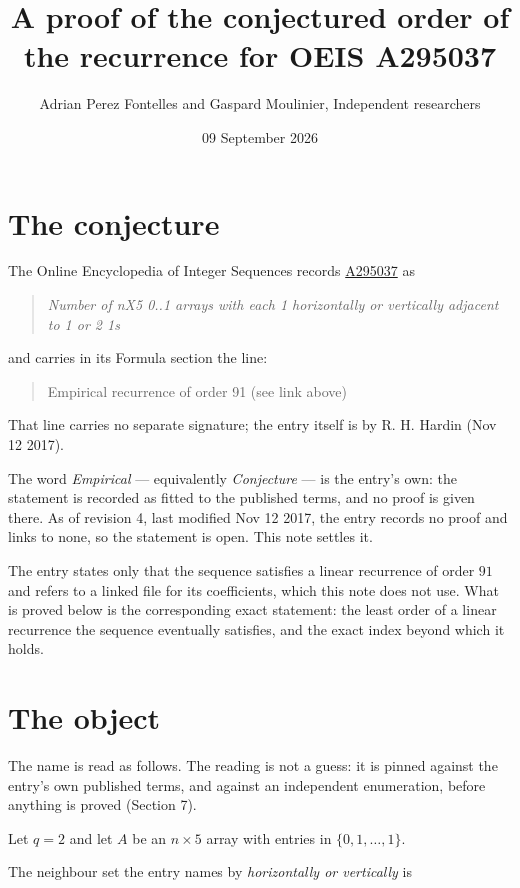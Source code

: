 \documentclass[11pt]{article}
\title{A proof of the conjectured order of the recurrence for OEIS A295037}
\author{Adrian Perez Fontelles and Gaspard Moulinier, Independent researchers}
\date{09 September 2026}
\theoremstyle{definition}
\begin{document}
\maketitle
\section{The conjecture}

The Online Encyclopedia of Integer Sequences records \href{https://oeis.org/A295037}{A295037} as

\begin{quote}\itshape Number of nX5 0..1 arrays with each 1 horizontally or vertically adjacent to 1 or 2 1s\end{quote}

and carries in its Formula section the line:

\begin{quote}\ttfamily Empirical recurrence of order 91 (see link above)\end{quote}

That line carries no separate signature; the entry itself is by R. H. Hardin (Nov 12 2017).

The word {\itshape Empirical} --- equivalently {\itshape Conjecture} --- is the entry's own: the statement is recorded as fitted to the published terms, and no proof is given there. As of revision 4, last modified Nov 12 2017, the entry records no proof and links to none, so the statement is open. This note settles it.

The entry states only that the sequence satisfies a linear recurrence of order $91$ and refers to a linked file for its coefficients, which this note does not use. What is proved below is the corresponding exact statement: the least order of a linear recurrence the sequence eventually satisfies, and the exact index beyond which it holds.

\section{The object}

The name is read as follows. The reading is not a guess: it is pinned against the entry's own published terms, and against an independent enumeration, before anything is proved (Section 7).

Let $q = 2$ and let $A$ be an $n \times 5$ array with entries in $\{0,1,\dots,1\}$.

The neighbour set the entry names by {\itshape horizontally or vertically} is
\end{document}
